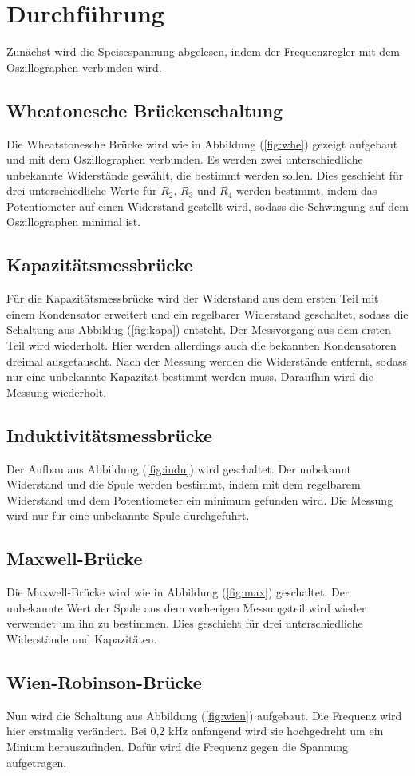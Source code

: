 
  \section{Durchführung}
  Zunächst wird die Speisespannung abgelesen, indem der Frequenzregler mit dem Oszillographen verbunden wird.
  \subsection{Wheatonesche Brückenschaltung}
  Die Wheatstonesche Brücke wird wie in Abbildung (\ref{fig:whe}) gezeigt aufgebaut und mit dem Oszillographen verbunden.
  Es werden zwei unterschiedliche unbekannte Widerstände gewählt, die bestimmt werden sollen.
  Dies geschieht für drei unterschiedliche Werte für $R_2$.
  $R_3$ und $R_4$ werden bestimmt, indem das Potentiometer auf einen Widerstand gestellt wird,
  sodass die Schwingung auf dem Oszillographen minimal ist.

  \subsection{Kapazitätsmessbrücke}
  Für die Kapazitätsmessbrücke wird der Widerstand aus dem ersten Teil mit einem Kondensator erweitert und ein regelbarer Widerstand geschaltet,
  sodass die Schaltung aus Abbildug (\ref{fig:kapa}) entsteht.
  Der Messvorgang aus dem ersten Teil wird  wiederholt.
  Hier werden allerdings auch die bekannten Kondensatoren dreimal ausgetauscht.
  Nach der Messung werden die Widerstände entfernt, sodass nur eine unbekannte Kapazität bestimmt werden muss.
  Daraufhin wird die Messung wiederholt.
  \subsection{Induktivitätsmessbrücke}
  Der Aufbau aus Abbildung (\ref{fig:indu}) wird geschaltet.
  Der unbekannt Widerstand und die Spule werden bestimmt,
  indem mit dem regelbarem Widerstand und dem Potentiometer ein minimum gefunden wird.
  Die Messung wird nur für eine unbekannte Spule durchgeführt.
  \subsection{Maxwell-Brücke}
  Die Maxwell-Brücke wird wie in Abbildung (\ref{fig:max}) geschaltet.
  Der unbekannte Wert der Spule aus dem vorherigen Messungsteil wird wieder verwendet um ihn zu bestimmen.
  Dies geschieht für drei unterschiedliche Widerstände und Kapazitäten.

  \subsection{Wien-Robinson-Brücke}
  Nun wird die Schaltung aus Abbildung (\ref{fig:wien}) aufgebaut.
  Die Frequenz wird hier erstmalig verändert.
  Bei 0,2 kHz anfangend wird sie hochgedreht um ein Minium herauszufinden.
  Dafür wird die Frequenz gegen die Spannung aufgetragen.
